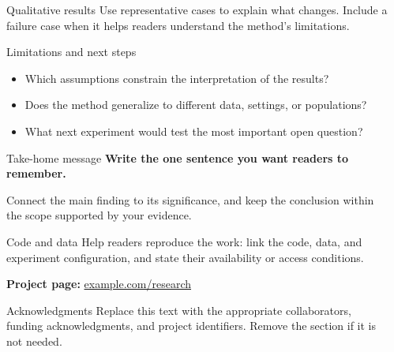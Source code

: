 \documentclass[final]{beamer}
\newlength{\sepwidth}
\newlength{\colwidth}
\newcommand{\separatorcolumn}{\begin{column}{\sepwidth}\end{column}}
\begin{document}
\begin{frame}[t]
\begin{columns}[t]
\begin{column}{\colwidth}
\begin{block}{Qualitative results}
    Use representative cases to explain what changes. Include a failure case
    when it helps readers understand the method's limitations.
  \end{block}

  \begin{block}{Limitations and next steps}
    \begin{itemize}
      \item Which assumptions constrain the interpretation of the results?
      \item Does the method generalize to different data, settings, or populations?
      \item What next experiment would test the most important open question?
    \end{itemize}
  \end{block}

  \begin{alertblock}{Take-home message}
    \textbf{Write the one sentence you want readers to remember.}

    Connect the main finding to its significance, and keep the conclusion within
    the scope supported by your evidence.
  \end{alertblock}

  \begin{block}{Code and data}
    Help readers reproduce the work: link the code, data, and experiment
    configuration, and state their availability or access conditions.

    \textbf{Project page:} \href{https://example.com/research}{example.com/research}
  \end{block}

  \begin{block}{Acknowledgments}
    Replace this text with the appropriate collaborators, funding acknowledgments,
    and project identifiers. Remove the section if it is not needed.
  \end{block}
\end{column}

\separatorcolumn
\end{columns}
\end{frame}
\end{document}
